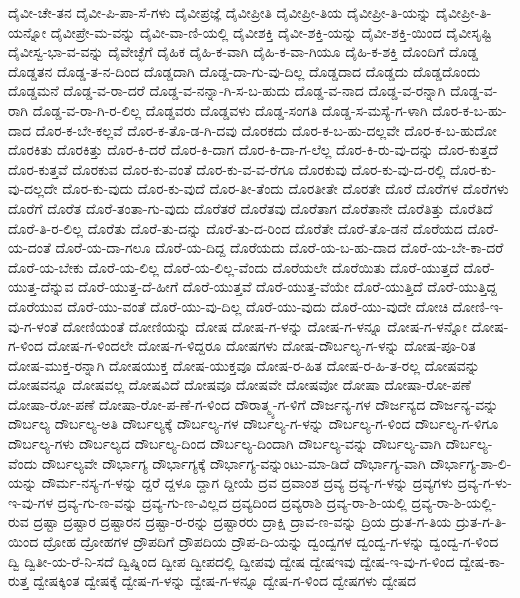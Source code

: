 {ದೈವೀ-ಚೇ-ತನ
ದೈವೀ-ಪಿ-ಪಾ-ಸೆ-ಗಳು
ದೈವೀಪ್ರಜ್ಞೆ
ದೈವೀಪ್ರೀತಿ
ದೈವೀಪ್ರೀ-ತಿಯ
ದೈವೀಪ್ರೀ-ತಿ-ಯನ್ನು
ದೈವೀಪ್ರೀ-ತಿ-ಯನ್ನೋ
ದೈವೀಪ್ರೇ-ಮ-ವನ್ನು
ದೈವೀ-ವಾ-ಣಿ-ಯಲ್ಲಿ
ದೈವೀಶಕ್ತಿ
ದೈವೀ-ಶಕ್ತಿ-ಯನ್ನು
ದೈವೀ-ಶಕ್ತಿ-ಯಿಂದ
ದೈವೀಸೃಷ್ಟಿ
ದೈವೀಸ್ವ-ಭಾ-ವ-ವನ್ನು
ದೈವೇಚ್ಛೆಗೆ
ದೈಹಿಕ
ದೈಹಿ-ಕ-ವಾಗಿ
ದೈಹಿ-ಕ-ವಾ-ಗಿಯೂ
ದೈಹಿ-ಕ-ಶಕ್ತಿ
ದೊಂದಿಗೆ
ದೊಡ್ಡ
ದೊಡ್ಡತನ
ದೊಡ್ಡ-ತ-ನ-ದಿಂದ
ದೊಡ್ಡದಾಗಿ
ದೊಡ್ಡ-ದಾ-ಗು-ವು-ದಿಲ್ಲ
ದೊಡ್ಡದಾದ
ದೊಡ್ಡದು
ದೊಡ್ಡದೊಂದು
ದೊಡ್ಡಮನೆ
ದೊಡ್ಡ-ವ-ರಾ-ದರೆ
ದೊಡ್ಡ-ವ-ನನ್ನಾ-ಗಿ-ಸ-ಬ-ಹುದು
ದೊಡ್ಡ-ವ-ನಾದ
ದೊಡ್ಡ-ವ-ರನ್ನಾಗಿ
ದೊಡ್ಡ-ವ-ರಾಗಿ
ದೊಡ್ಡ-ವ-ರಾ-ಗಿ-ರ-ಲಿಲ್ಲ
ದೊಡ್ಡವರು
ದೊಡ್ಡವಳು
ದೊಡ್ಡ-ಸಂಗತಿ
ದೊಡ್ಡ-ಸ-ಮಸ್ಯೆ-ಗ-ಳಾಗಿ
ದೊರ-ಕ-ಬ-ಹು-ದಾದ
ದೊರ-ಕ-ಬೇ-ಕಲ್ಲವೆ
ದೊರ-ಕ-ತೊ-ಡ-ಗಿ-ದವು
ದೊರಕದು
ದೊರ-ಕ-ಬ-ಹು-ದಲ್ಲವೇ
ದೊರ-ಕ-ಬ-ಹುದೋ
ದೊರಕಿತು
ದೊರಕಿತ್ತು
ದೊರ-ಕಿ-ದರೆ
ದೊರ-ಕಿ-ದಾಗ
ದೊರ-ಕಿ-ದಾ-ಗ-ಲೆಲ್ಲ
ದೊರ-ಕಿ-ರು-ವು-ದನ್ನು
ದೊರ-ಕುತ್ತದೆ
ದೊರ-ಕುತ್ತವೆ
ದೊರಕುವ
ದೊರ-ಕು-ವಂತೆ
ದೊರ-ಕು-ವ-ವ-ರೆಗೂ
ದೊರಕುವು
ದೊರ-ಕು-ವು-ದ-ರಲ್ಲಿ
ದೊರ-ಕು-ವು-ದಲ್ಲದೇ
ದೊರ-ಕು-ವುದು
ದೊರ-ಕು-ವುದೆ
ದೊರ-ತೀ-ತೆಂದು
ದೊರತೀತೇ
ದೊರತೇ
ದೊರೆ
ದೊರೆಗಳ
ದೊರೆಗಳು
ದೊರೆಗೆ
ದೊರೆತ
ದೊರೆ-ತಂತಾ-ಗು-ವುದು
ದೊರೆತರೆ
ದೊರೆತವು
ದೊರೆತಾಗ
ದೊರೆತಾನೇ
ದೊರೆತಿತ್ತು
ದೊರೆತಿದೆ
ದೊರೆ-ತಿ-ರ-ಲಿಲ್ಲ
ದೊರೆತು
ದೊರೆ-ತು-ದನ್ನು
ದೊರೆ-ತು-ದ-ರಿಂದ
ದೊರೆತೇ
ದೊರೆ-ತೊ-ಡನೆ
ದೊರೆಯದ
ದೊರೆ-ಯ-ದಂತೆ
ದೊರೆ-ಯ-ದಾ-ಗಲೂ
ದೊರೆ-ಯ-ದಿದ್ದ
ದೊರೆಯದು
ದೊರೆ-ಯ-ಬ-ಹು-ದಾದ
ದೊರೆ-ಯ-ಬೇ-ಕಾ-ದರೆ
ದೊರೆ-ಯ-ಬೇಕು
ದೊರೆ-ಯ-ಲಿಲ್ಲ
ದೊರೆ-ಯ-ಲಿಲ್ಲ-ವೆಂದು
ದೊರೆಯಲೇ
ದೊರೆಯಿತು
ದೊರೆ-ಯುತ್ತದೆ
ದೊರೆ-ಯುತ್ತ-ದೆನ್ನುವ
ದೊರೆ-ಯುತ್ತ-ದೆ-ಹೀಗೆ
ದೊರೆ-ಯುತ್ತವೆ
ದೊರೆ-ಯುತ್ತ-ವೆಯೇ
ದೊರೆ-ಯುತ್ತಿದೆ
ದೊರೆ-ಯುತ್ತಿದ್ದ
ದೊರೆಯುವ
ದೊರೆ-ಯು-ವಂತೆ
ದೊರೆ-ಯು-ವು-ದಿಲ್ಲ
ದೊರೆ-ಯು-ವುದು
ದೊರೆ-ಯು-ವುದೇ
ದೋಚಿ
ದೋಣಿ-ಇ-ವು-ಗ-ಳಂತೆ
ದೋಣಿಯಂತೆ
ದೋಣಿಯನ್ನು
ದೋಷ
ದೋಷ-ಗ-ಳನ್ನು
ದೋಷ-ಗ-ಳನ್ನೂ
ದೋಷ-ಗ-ಳನ್ನೋ
ದೋಷ-ಗ-ಳಿಂದ
ದೋಷ-ಗ-ಳಿಂದಲೇ
ದೋಷ-ಗ-ಳಿದ್ದರೂ
ದೋಷಗಳು
ದೋಷ-ದೌರ್ಬಲ್ಯ-ಗ-ಳನ್ನು
ದೋಷ-ಪೂ-ರಿತ
ದೋಷ-ಮುಕ್ತ-ರನ್ನಾಗಿ
ದೋಷಯುಕ್ತ
ದೋಷ-ಯುಕ್ತವೂ
ದೋಷ-ರ-ಹಿತ
ದೋಷ-ರ-ಹಿ-ತ-ರಲ್ಲ
ದೋಷವನ್ನು
ದೋಷವನ್ನೂ
ದೋಷವಲ್ಲ
ದೋಷವಿದೆ
ದೋಷವೂ
ದೋಷವೇ
ದೋಷವೋ
ದೋಷಾ
ದೋಷಾ-ರೋ-ಪಣೆ
ದೋಷಾ-ರೋ-ಪಣೆ
ದೋಷಾ-ರೋ-ಪ-ಣೆ-ಗ-ಳಿಂದ
ದೌರಾತ್ಮ್ಯ-ಗ-ಳಿಗೆ
ದೌರ್ಜನ್ಯ-ಗಳ
ದೌರ್ಜನ್ಯದ
ದೌರ್ಜನ್ಯ-ವನ್ನು
ದೌರ್ಬಲ್ಯ
ದೌರ್ಬಲ್ಯ-ಅತಿ
ದೌರ್ಬಲ್ಯಕ್ಕೆ
ದೌರ್ಬಲ್ಯ-ಗಳ
ದೌರ್ಬಲ್ಯ-ಗ-ಳನ್ನು
ದೌರ್ಬಲ್ಯ-ಗ-ಳಿಂದ
ದೌರ್ಬಲ್ಯ-ಗ-ಳಿಗೂ
ದೌರ್ಬಲ್ಯ-ಗಳು
ದೌರ್ಬಲ್ಯದ
ದೌರ್ಬಲ್ಯ-ದಿಂದ
ದೌರ್ಬಲ್ಯ-ದಿಂದಾಗಿ
ದೌರ್ಬಲ್ಯ-ವನ್ನು
ದೌರ್ಬಲ್ಯ-ವಾಗಿ
ದೌರ್ಬಲ್ಯ-ವೆಂದು
ದೌರ್ಬಲ್ಯವೇ
ದೌರ್ಭಾಗ್ಯ
ದೌರ್ಭಾಗ್ಯಕ್ಕೆ
ದೌರ್ಭಾಗ್ಯ-ವನ್ನುಂಟು-ಮಾ-ಡಿದೆ
ದೌರ್ಭಾಗ್ಯ-ವಾಗಿ
ದೌರ್ಭಾಗ್ಯ-ಶಾ-ಲಿ-ಯನ್ನು
ದೌರ್ಮ-ನಸ್ಯ-ಗ-ಳನ್ನು
ದ್ದರೆ
ದ್ದಳೂ
ದ್ದಾಗ
ದ್ದೀಯೆ
ದ್ರವ
ದ್ರವಾಂಶ
ದ್ರವ್ಯ
ದ್ರವ್ಯ-ಗ-ಳನ್ನು
ದ್ರವ್ಯಗಳು
ದ್ರವ್ಯ-ಗ-ಳು-ಇ-ವು-ಗಳ
ದ್ರವ್ಯ-ಗು-ಣ-ವನ್ನು
ದ್ರವ್ಯ-ಗು-ಣ-ವಿಲ್ಲದ
ದ್ರವ್ಯದಿಂದ
ದ್ರವ್ಯರಾಶಿ
ದ್ರವ್ಯ-ರಾ-ಶಿ-ಯಲ್ಲಿ
ದ್ರವ್ಯ-ರಾ-ಶಿ-ಯಲ್ಲಿ-ರುವ
ದ್ರಷ್ಟಾ
ದ್ರಷ್ಟಾರ
ದ್ರಷ್ಟಾರನ
ದ್ರಷ್ಟಾ-ರ-ರನ್ನು
ದ್ರಷ್ಟಾರರು
ದ್ರಾಕ್ಷಿ
ದ್ರಾವ-ಣ-ವನ್ನು
ದ್ರಿಯ
ದ್ರುತ-ಗ-ತಿಯ
ದ್ರುತ-ಗ-ತಿ-ಯಿಂದ
ದ್ರೋಹ
ದ್ರೋಹಗಳ
ದ್ರೌಪದಿಗೆ
ದ್ರೌಪದಿಯ
ದ್ರೌಪ-ದಿ-ಯನ್ನು
ದ್ವಂದ್ವಗಳ
ದ್ವಂದ್ವ-ಗ-ಳನ್ನು
ದ್ವಂದ್ವ-ಗ-ಳಿಂದ
ದ್ವಿ
ದ್ವಿತೀ-ಯ-ರೆ-ನಿ-ಸದೆ
ದ್ವಿಷ್ನಿಂದ
ದ್ವೀಪ
ದ್ವೀಪದಲ್ಲಿ
ದ್ವೀಪವು
ದ್ವೇಷ
ದ್ವೇಷಇವು
ದ್ವೇಷ-ಇ-ವು-ಗ-ಳಿಂದ
ದ್ವೇಷ-ಕಾ-ರುತ್ತ
ದ್ವೇಷಕ್ಕಿಂತ
ದ್ವೇಷಕ್ಕೆ
ದ್ವೇಷ-ಗ-ಳನ್ನು
ದ್ವೇಷ-ಗ-ಳನ್ನೂ
ದ್ವೇಷ-ಗ-ಳಿಂದ
ದ್ವೇಷಗಳು
ದ್ವೇಷದ
}
